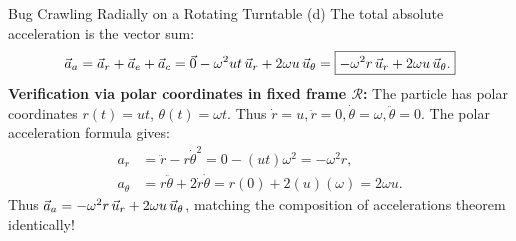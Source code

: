\begin{workedexample}{Bug Crawling Radially on a Rotating Turntable}
(d) The total absolute acceleration is the vector sum:
\[
\vec{a}_a = \vec{a}_r + \vec{a}_e + \vec{a}_c = \vec{0} - \omega^2 ut\,\vec{u}_r + 2\omega u\,\vec{u}_\theta = \boxed{-\omega^2 r\,\vec{u}_r + 2\omega u\,\vec{u}_\theta.}
\]
\textbf{Verification via polar coordinates in fixed frame $\mathcal{R}$:}
The particle has polar coordinates $r(t) = ut$, $\theta(t) = \omega t$.
Thus $\dot{r} = u, \ddot{r} = 0, \dot{\theta} = \omega, \ddot{\theta} = 0$.
The polar acceleration formula gives:
\begin{align*}
a_r &= \ddot{r} - r\dot{\theta}^2 = 0 - (ut)\omega^2 = -\omega^2 r, \\
a_\theta &= r\ddot{\theta} + 2\dot{r}\dot{\theta} = r(0) + 2(u)(\omega) = 2\omega u.
\end{align*}
Thus $\vec{a}_a = -\omega^2 r\,\vec{u}_r + 2\omega u\,\vec{u}_\theta$, matching the composition of accelerations theorem identically!
\end{workedexample}

